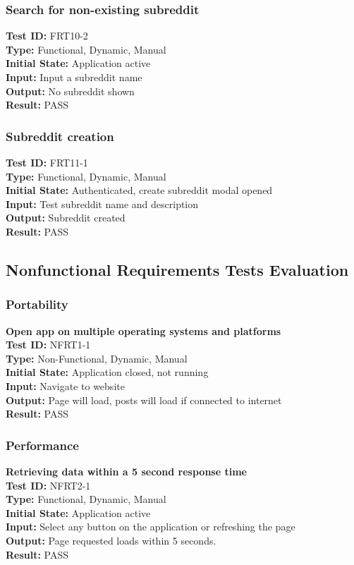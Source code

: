 \documentclass[12pt,fleqn]{article}
\begin{document}
\subsubsection{Search for non-existing subreddit}
\textbf{Test ID:} FRT10-2\\
\textbf{Type:} Functional, Dynamic, Manual\\
\textbf{Initial State:} Application active \\
\textbf{Input:} Input a subreddit name \\
\textbf{Output:} No subreddit shown\\
\textbf{Result:} PASS
\newpage
\subsubsection{Subreddit creation}
\textbf{Test ID:} FRT11-1\\
\textbf{Type:} Functional, Dynamic, Manual\\
\textbf{Initial State:} Authenticated, create subreddit modal opened\\
\textbf{Input:} Test subreddit name and description\\
\textbf{Output:} Subreddit created\\
\textbf{Result:} PASS

\subsection{Nonfunctional Requirements Tests Evaluation}

\subsubsection{Portability}
\textbf{Open app on multiple operating systems and platforms}\\
\textbf{Test ID:} NFRT1-1\\
\textbf{Type:} Non-Functional, Dynamic, Manual\\
\textbf{Initial State:} Application closed, not running \\
\textbf{Input:} Navigate to website \\
\textbf{Output:} Page will load, posts will load if connected to internet\\
\textbf{Result:} PASS

\subsubsection{Performance}
\textbf{Retrieving data within a 5 second response time}\\
\textbf{Test ID:} NFRT2-1\\ 
\textbf{Type:} Functional, Dynamic, Manual\\
\textbf{Initial State:} Application active \\
\textbf{Input:} Select any button on the application or refreshing the page\\
\textbf{Output:} Page requested loads within 5 seconds. \\
\textbf{Result:} PASS
\end{document}
